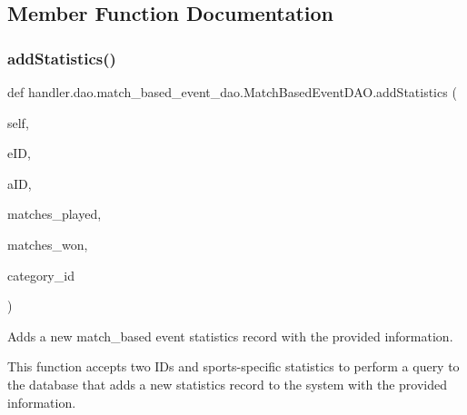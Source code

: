 \subsection{Member Function Documentation}
\mbox{\label{classhandler_1_1dao_1_1match__based__event__dao_1_1_match_based_event_d_a_o_a44e2ec5ef7ecf91f5a88bb2b87ae9012}} 
\subsubsection{\texorpdfstring{add\+Statistics()}{addStatistics()}}
{\footnotesize\ttfamily def handler.\+dao.\+match\+\_\+based\+\_\+event\+\_\+dao.\+Match\+Based\+Event\+D\+A\+O.\+add\+Statistics (\begin{DoxyParamCaption}\item[{}]{self,  }\item[{}]{e\+ID,  }\item[{}]{a\+ID,  }\item[{}]{matches\+\_\+played,  }\item[{}]{matches\+\_\+won,  }\item[{}]{category\+\_\+id }\end{DoxyParamCaption})}



Adds a new match\+\_\+based event statistics record with the provided information. 

This function accepts two I\+Ds and sports-\/specific statistics to perform a query to the database that adds a new statistics record to the system with the provided information.


